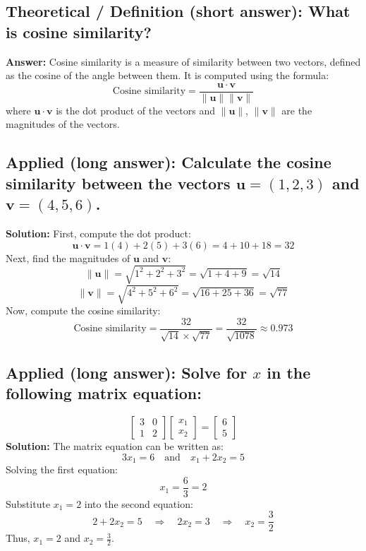 \documentclass[12pt]{article}
\begin{document}
\subsection{Theoretical / Definition (short answer): What is cosine similarity?}
\textbf{Answer:} Cosine similarity is a measure of similarity between two vectors, defined as the cosine of the angle between them. It is computed using the formula:
\[
\text{Cosine similarity} = \frac{\mathbf{u} \cdot \mathbf{v}}{\|\mathbf{u}\| \|\mathbf{v}\|}
\]
where \( \mathbf{u} \cdot \mathbf{v} \) is the dot product of the vectors and \( \|\mathbf{u}\| \), \( \|\mathbf{v}\| \) are the magnitudes of the vectors.

\subsection{Applied (long answer): Calculate the cosine similarity between the vectors \( \mathbf{u} = (1, 2, 3) \) and \( \mathbf{v} = (4, 5, 6) \).}
\textbf{Solution:}
First, compute the dot product:
\[
\mathbf{u} \cdot \mathbf{v} = 1(4) + 2(5) + 3(6) = 4 + 10 + 18 = 32
\]
Next, find the magnitudes of \( \mathbf{u} \) and \( \mathbf{v} \):
\[
\|\mathbf{u}\| = \sqrt{1^2 + 2^2 + 3^2} = \sqrt{1 + 4 + 9} = \sqrt{14}
\]
\[
\|\mathbf{v}\| = \sqrt{4^2 + 5^2 + 6^2} = \sqrt{16 + 25 + 36} = \sqrt{77}
\]
Now, compute the cosine similarity:
\[
\text{Cosine similarity} = \frac{32}{\sqrt{14} \times \sqrt{77}} = \frac{32}{\sqrt{1078}} \approx 0.973
\]

\subsection{Applied (long answer): Solve for \( x \) in the following matrix equation:}
\[
\begin{bmatrix} 3 & 0 \\ 1 & 2 \end{bmatrix} \begin{bmatrix} x_1 \\ x_2 \end{bmatrix} = \begin{bmatrix} 6 \\ 5 \end{bmatrix}
\]
\textbf{Solution:}
The matrix equation can be written as:
\[
3x_1 = 6 \quad \text{and} \quad x_1 + 2x_2 = 5
\]
Solving the first equation:
\[
x_1 = \frac{6}{3} = 2
\]
Substitute \( x_1 = 2 \) into the second equation:
\[
2 + 2x_2 = 5 \quad \Rightarrow \quad 2x_2 = 3 \quad \Rightarrow \quad x_2 = \frac{3}{2}
\]
Thus, \( x_1 = 2 \) and \( x_2 = \frac{3}{2} \).
\end{document}

